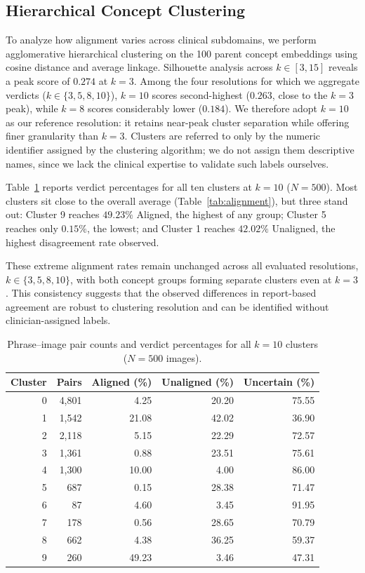 \subsection{Hierarchical Concept Clustering}
To analyze how alignment varies across clinical subdomains, we perform agglomerative hierarchical clustering on the 100 parent concept embeddings using cosine distance and average linkage. Silhouette analysis across $k \in [3, 15]$ reveals a peak score of $0.274$ at $k=3$. Among the four resolutions for which we aggregate verdicts ($k \in \{3,5,8,10\}$), $k=10$ scores second-highest ($0.263$, close to the $k=3$ peak), while $k=8$ scores considerably lower ($0.184$). We therefore adopt $k=10$ as our reference resolution: it retains near-peak cluster separation while offering finer granularity than $k=3$. Clusters are referred to only by the numeric identifier assigned by the clustering algorithm; we do not assign them descriptive names, since we lack the clinical expertise to validate such labels ourselves.

Table~\ref{tab:clusters} reports verdict percentages for all ten clusters at $k=10$ ($N=500$). Most clusters sit close to the overall average (Table~\ref{tab:alignment}), but three stand out: Cluster 9 reaches $49.23\%$ Aligned, the highest of any group; Cluster 5 reaches only $0.15\%$, the lowest; and Cluster 1 reaches $42.02\%$ Unaligned, the highest disagreement rate observed.

These extreme alignment rates remain unchanged across all evaluated resolutions, $k \in \{3,5,8,10\}$, with both concept groups forming separate clusters even at $k=3$. This consistency suggests that the observed differences in report-based agreement are robust to clustering resolution and can be identified without clinician-assigned labels.
\begin{table}[htbp]
\centering
\caption{Phrase--image pair counts and verdict percentages for all $k=10$ clusters ($N=500$ images).}
\label{tab:clusters}
\small
\setlength{\tabcolsep}{4pt}
\begin{tabular}{@{}rrrrr@{}}
\toprule
Cluster & Pairs & Aligned (\%) & Unaligned (\%) & Uncertain (\%) \\
\midrule
0 & 4,801 & 4.25 & 20.20 & 75.55 \\
1 & 1,542 & 21.08 & 42.02 & 36.90 \\
2 & 2,118 & 5.15 & 22.29 & 72.57 \\
3 & 1,361 & 0.88 & 23.51 & 75.61 \\
4 & 1,300 & 10.00 & 4.00 & 86.00 \\
5 & 687 & 0.15 & 28.38 & 71.47 \\
6 & 87 & 4.60 & 3.45 & 91.95 \\
7 & 178 & 0.56 & 28.65 & 70.79 \\
8 & 662 & 4.38 & 36.25 & 59.37 \\
9 & 260 & 49.23 & 3.46 & 47.31 \\
\bottomrule
\end{tabular}
\end{table}


